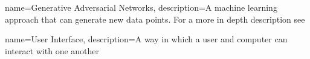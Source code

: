 
{
    name=Generative Adversarial Networks,
    description={A machine learning approach that can generate new data points. For a more in depth description see }
}

{
    name=User Interface,
    description={A way in which a user and computer can interact with one another}
}


